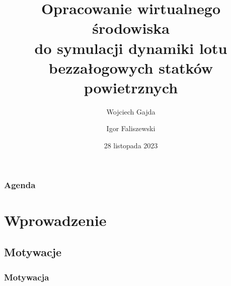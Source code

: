 \documentclass[aspectratio=169]{beamer}
\title{Opracowanie wirtualnego środowiska\\do symulacji dynamiki lotu\\ bezzałogowych statków powietrznych}
\author{Wojciech Gajda \and  Igor Faliszewski}
\date{28 listopada 2023} %
\begin{document}
\sloppy

{
\maketitleframe 
}

\begin{frame}
\frametitle{Agenda}
  \tableofcontents[  
    sectionstyle=show, 
    ]
\end{frame}

\section{Wprowadzenie}
\subsection{Motywacje}
\begin{frame}%
	\frametitle{Motywacja}
	\begin{columns}
		\begin{column}{0.33\textwidth}
	   	 	\begin{figure}
	   		 \centering
	    		\end{figure}
		\end{column}
		\begin{column}{0.33\textwidth}
	   	 	\begin{figure}
	   		 \centering

\end{figure}
\end{column}
\end{columns}
\end{frame}
\end{document}
